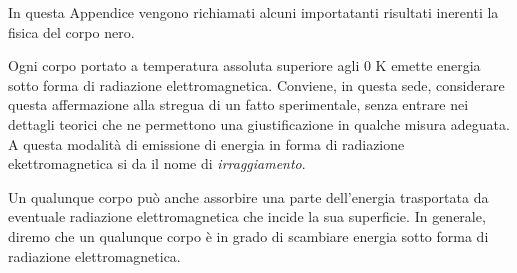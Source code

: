 
\label{app:cnero}
In questa Appendice vengono richiamati alcuni importatanti risultati inerenti la fisica del corpo nero. 
\par
Ogni corpo portato a temperatura assoluta superiore agli $0$ K emette energia sotto forma di radiazione elettromagnetica.
Conviene, in questa sede, considerare questa affermazione alla stregua di un fatto sperimentale, senza entrare nei dettagli teorici che ne permettono una giustificazione in qualche misura adeguata. 
A questa modalit\`a di emissione di energia in forma di radiazione ekettromagnetica si da il nome di \emph{irraggiamento}.
\par
Un qualunque corpo pu\`o anche assorbire una parte dell'energia trasportata da eventuale radiazione elettromagnetica che incide la sua superficie.
In generale, diremo che un qualunque corpo \`e in grado di scambiare energia sotto forma di radiazione elettromagnetica.




